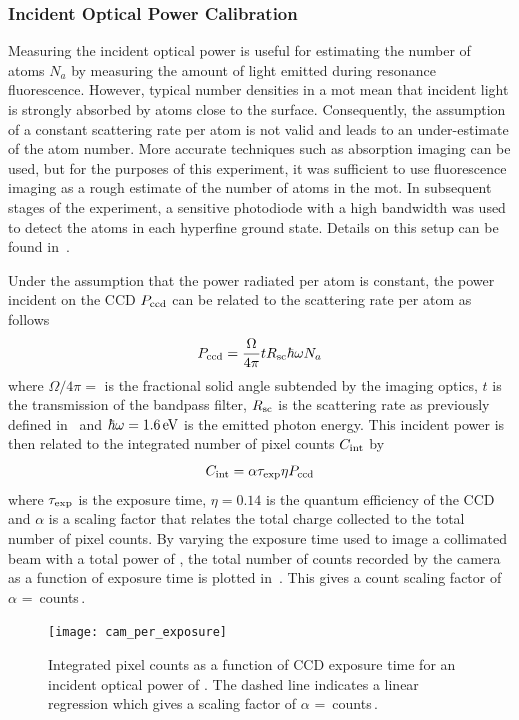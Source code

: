 \subsubsection{Incident Optical Power Calibration} 
Measuring the incident optical power is useful for estimating the number of atoms \(N_a\) by measuring the amount of light emitted during resonance fluorescence. However, typical number densities in a \ac{mot} mean that incident light is strongly absorbed by atoms close to the surface. Consequently, the
assumption of a constant scattering rate per atom is not valid and leads to an
under-estimate of the atom number. More accurate techniques such as absorption imaging can be used, but for the purposes of this experiment, it was
sufficient to use fluorescence imaging as a rough estimate of the
number of atoms in the \ac{mot}. In subsequent stages of the experiment, a sensitive photodiode with a high bandwidth was used to detect the atoms in each hyperfine ground state. Details on this setup can
be found in~. \par\noindent
Under the assumption that the
power radiated per atom is constant, the power incident on the CCD
\(P_\textnormal{ccd}\) can be related to the scattering rate per atom as follows
\begin{equation}
	P_\textnormal{ccd} = \frac{\Omega}{4\pi} t R_\textnormal{sc}  \hbar \omega N_a
\end{equation}
where $\Omega/4\pi = $ is the fractional solid angle subtended by
the imaging optics, \(t\) is the transmission of the bandpass filter,
\(R_\textnormal{sc}\) is the scattering rate as previously defined
in~ and \(\hbar \omega =
\sivalue{1.6}{\electronvolt}\) is the emitted photon energy. This incident power
is then related to the integrated number of pixel counts \(C_\textnormal{int}\)
by
\begin{equation}
	C_\textnormal{int} = \alpha \tau_\textnormal{exp} \eta P_\textnormal{ccd}
\end{equation}
where \(\tau_\textnormal{exp}\) is the exposure time, \(\eta = 0.14\) is the
quantum efficiency of the CCD and \(\alpha\) is a scaling factor that relates
the total charge collected to the total number of pixel counts. By varying the
exposure time used to image a collimated beam with a total power of
, the total number of counts recorded by the camera
as a function of exposure time is plotted in~. This
gives a count scaling factor of \(\alpha\) =
\,counts\,\sivalue{}{\per\micro\second\per\micro\watt}.
\begin{figure}[!htbp]
	\centering
	\texttt{[image: cam\_per\_exposure]}
	\caption[Integrated pixel counts as a function of CCD exposure
		time.]{Integrated pixel counts as a function of CCD exposure time for an
		incident optical power of . The dashed line
		indicates a linear regression which gives a scaling factor of \(\alpha\)
		=
		\,counts\,\sivalue{}{\per\micro\second\per\micro\watt}.}
	\label{fig:camera_counts}
\end{figure}

